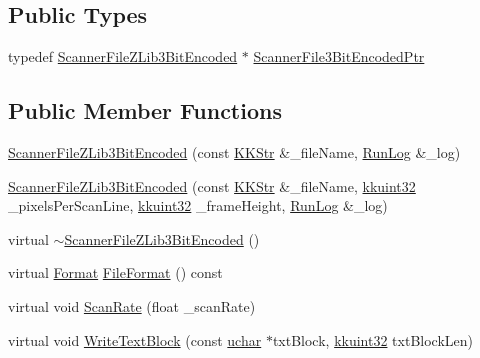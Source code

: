 \subsection*{Public Types}
\begin{DoxyCompactItemize}
\item 
typedef \hyperlink{class_k_k_l_s_c_1_1_scanner_file_z_lib3_bit_encoded}{Scanner\+File\+Z\+Lib3\+Bit\+Encoded} $\ast$ \hyperlink{class_k_k_l_s_c_1_1_scanner_file_z_lib3_bit_encoded_a9d1499c70bf05780736561e3e274a6da}{Scanner\+File3\+Bit\+Encoded\+Ptr}
\end{DoxyCompactItemize}
\subsection*{Public Member Functions}
\begin{DoxyCompactItemize}
\item 
\hyperlink{class_k_k_l_s_c_1_1_scanner_file_z_lib3_bit_encoded_aca0cd86c9a9911f19d1e1d1ced8bc5dd}{Scanner\+File\+Z\+Lib3\+Bit\+Encoded} (const \hyperlink{class_k_k_b_1_1_k_k_str}{K\+K\+Str} \&\+\_\+file\+Name, \hyperlink{class_k_k_b_1_1_run_log}{Run\+Log} \&\+\_\+log)
\item 
\hyperlink{class_k_k_l_s_c_1_1_scanner_file_z_lib3_bit_encoded_aa70dc9c40aa0466982844faae8d0a892}{Scanner\+File\+Z\+Lib3\+Bit\+Encoded} (const \hyperlink{class_k_k_b_1_1_k_k_str}{K\+K\+Str} \&\+\_\+file\+Name, \hyperlink{namespace_k_k_b_af8d832f05c54994a1cce25bd5743e19a}{kkuint32} \+\_\+pixels\+Per\+Scan\+Line, \hyperlink{namespace_k_k_b_af8d832f05c54994a1cce25bd5743e19a}{kkuint32} \+\_\+frame\+Height, \hyperlink{class_k_k_b_1_1_run_log}{Run\+Log} \&\+\_\+log)
\item 
virtual \hyperlink{class_k_k_l_s_c_1_1_scanner_file_z_lib3_bit_encoded_a7e6a3979e3de2705ccd45cd52638cab9}{$\sim$\+Scanner\+File\+Z\+Lib3\+Bit\+Encoded} ()
\item 
virtual \hyperlink{class_k_k_l_s_c_1_1_scanner_file_a9eb976c9d084a94db71a5e8d1fadb903}{Format} \hyperlink{class_k_k_l_s_c_1_1_scanner_file_z_lib3_bit_encoded_ae2f94a0d2e6c6b0722276a7277752bd3}{File\+Format} () const 
\item 
virtual void \hyperlink{class_k_k_l_s_c_1_1_scanner_file_z_lib3_bit_encoded_ab183b687cb8df89600dd5629770ccac2}{Scan\+Rate} (float \+\_\+scan\+Rate)
\item 
virtual void \hyperlink{class_k_k_l_s_c_1_1_scanner_file_z_lib3_bit_encoded_afd555a46be6e8f8f9d6f9178ba5ef218}{Write\+Text\+Block} (const \hyperlink{namespace_k_k_b_ace9969169bf514f9ee6185186949cdf7}{uchar} $\ast$txt\+Block, \hyperlink{namespace_k_k_b_af8d832f05c54994a1cce25bd5743e19a}{kkuint32} txt\+Block\+Len)
\end{DoxyCompactItemize}
